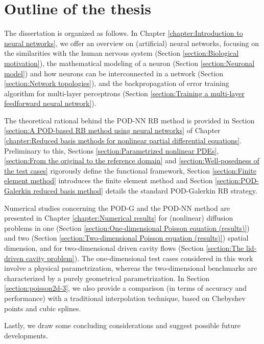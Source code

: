 \documentclass[12pt, a4paper, twoside, openright, notitlepage]{report}
\numberwithin{equation}{chapter}
\theoremstyle{theorem}
\theoremstyle{definition}
\theoremstyle{remark}
\theoremstyle{proposition}
\numberwithin{figure}{chapter}
\begin{document}
		\clearpage
		
		\section*{Outline of the thesis}
		
		The dissertation is organized as follows. In Chapter \ref{chapter:Introduction to neural networks}, we offer an overview on (artificial) neural networks, focusing on the similarities with the human nervous system (Section \ref{section:Biological motivation}), the mathematical modeling of a neuron (Section \ref{section:Neuronal model}) and how neurons can be interconnected in a network (Section \ref{section:Network topologies}), and the backpropagation of error training algorithm for multi-layer perceptrons (Section \ref{section:Training a multi-layer feedforward neural network}). 
		
		The theoretical rational behind the POD-NN RB method is provided in Section \ref{section:A POD-based RB method using neural networks} of Chapter \ref{chapter:Reduced basis methods for nonlinear partial differential equations}. Preliminary to this, Sections \ref{section:Parametrized nonlinear PDEs}, \ref{section:From the original to the reference domain} and \ref{section:Well-posedness of the test cases} rigorously define the functional framework, Section \ref{section:Finite element method} introduces the finite element method and Section \ref{section:POD-Galerkin reduced basis method} details the standard POD-Galerkin RB strategy. 
		
		Numerical studies concerning the POD-G and the POD-NN method are presented in Chapter \ref{chapter:Numerical results} for (nonlinear) diffusion problems in one (Section \ref{section:One-dimensional Poisson equation (results)}) and two (Section \ref{section:Two-dimensional Poisson equation (results)}) spatial dimension, and for two-dimensional driven cavity flows (Section \ref{section:The lid-driven cavity problem}). The one-dimensional test cases considered in this work involve a physical parametrization, whereas the two-dimensional benchmarks are characterized by a purely geometrical parametrization. In Section \ref{section:poisson2d-3}, we also provide a comparison (in terms of accuracy and performance) with a traditional interpolation technique, based on Chebyshev points and cubic splines.
		
		Lastly, we draw some concluding considerations and suggest possible future developments.
		
				
\end{document}
